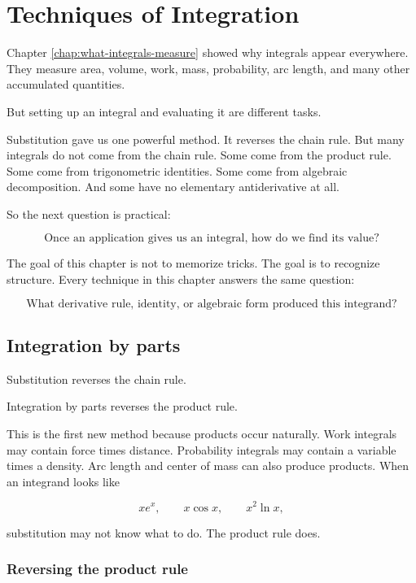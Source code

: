 
\chapter{Techniques of Integration}
\label{chap:techniques-of-integration}

Chapter \ref{chap:what-integrals-measure} showed why integrals appear everywhere.
They measure area, volume, work, mass, probability, arc length, and many other
accumulated quantities.

But setting up an integral and evaluating it are different tasks.

Substitution gave us one powerful method.  It reverses the chain rule.  But many
integrals do not come from the chain rule.  Some come from the product rule.  Some
come from trigonometric identities.  Some come from algebraic decomposition.  And
some have no elementary antiderivative at all.

So the next question is practical:

\[
\boxed{
\text{Once an application gives us an integral, how do we find its value?}
}
\]

The goal of this chapter is not to memorize tricks.  The goal is to recognize structure.
Every technique in this chapter answers the same question:

\[
\text{What derivative rule, identity, or algebraic form produced this integrand?}
\]

\section{Integration by parts}
\label{sec:integration-by-parts}

Substitution reverses the chain rule.

Integration by parts reverses the product rule.

This is the first new method because products occur naturally.  Work integrals may
contain force times distance.  Probability integrals may contain a variable times a
density.  Arc length and center of mass can also produce products.  When an integrand
looks like

\[
x e^x,\qquad x\cos x,\qquad x^2\ln x,
\]

substitution may not know what to do.  The product rule does.

\subsection{Reversing the product rule}
\label{subsec:reversing-product-rule}

